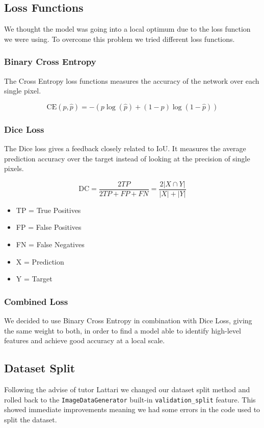 \documentclass{article}
\begin{document}
		\subsection{Loss Functions}
			
			We thought the model was going into a local optimum due to the loss function we were using. To overcome this problem we tried different loss functions. 
			
			\subsubsection{Binary Cross Entropy}
				
				The Cross Entropy loss functions measures the accuracy of the network over each single pixel.
				
				\[\text{CE}\left(p, \hat{p}\right) = -\left(p \log\left(\hat{p}\right) + (1-p) \log\left(1 - \hat{p}\right)\right)\]		
			
			\subsubsection{Dice Loss}
				
				The Dice loss gives a feedback closely related to IoU. It measures the average prediction accuracy over the target instead of looking at the precision of single pixels.
			
				\[\text{DC} = \frac{2 TP}{2 TP + FP + FN} = \frac{2|X \cap Y|}{|X| + |Y|}\]
				
				\begin{itemize}
					\item TP = True Positives
					\item FP = False Positives
					\item FN = False Negatives
					\item X = Prediction
					\item Y = Target
				\end{itemize}
			
			\subsubsection{Combined Loss}
				We decided to use Binary Cross Entropy in combination with Dice Loss, giving the same weight to both, in order to find a model able to identify high-level features and achieve good accuracy at a local scale.
				
		\subsection{Dataset Split}
			Following the advise of tutor Lattari we changed our dataset split method and rolled back to the \texttt{ImageDataGenerator} built-in \texttt{validation\_split} feature. This showed immediate improvements meaning we had some errors in the code used to split the dataset. 
		
\end{document}
